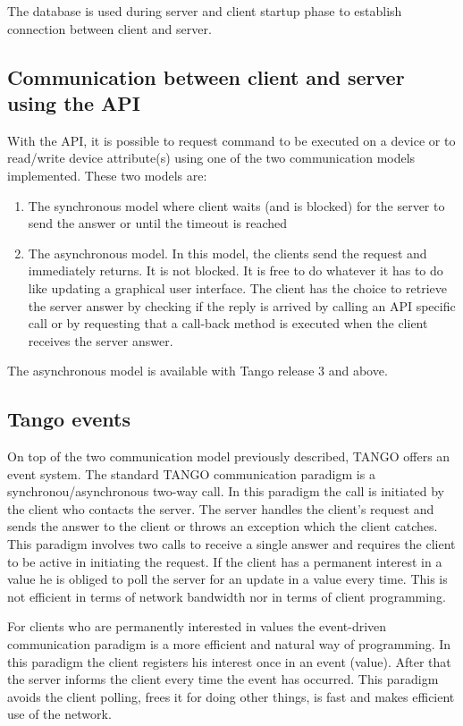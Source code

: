 \vspace{0.3cm}

The database is used during server and client startup phase to establish
connection between client and server.

\subsection{Communication between client and server using the API}

With the API, it is possible to request command to be executed on
a device or to read/write device attribute(s) using one of the two
communication models implemented. These two models are:
\begin{enumerate}
\item The synchronous model where client waits (and is blocked) for the
server to send the answer or until the timeout is reached
\item The asynchronous model. In this model, the clients send the request
and immediately returns. It is not blocked. It is free to do whatever
it has to do like updating a graphical user interface. The client
has the choice to retrieve the server answer by checking if the reply
is arrived by calling an API specific call or by requesting that a
call-back method is executed when the client receives the server answer.
\end{enumerate}
The asynchronous model is available with Tango release 3 and above.

\subsection{Tango events}

On top of the two communication model previously described, TANGO
offers an \textquotedbl{}event system\textquotedbl{}.
The standard TANGO communication paradigm is a synchronou/asynchronous
two-way call. In this paradigm the call is initiated by the client
who contacts the server. The server handles the client's request and
sends the answer to the client or throws an exception which the client
catches. This paradigm involves two calls to receive a single answer
and requires the client to be active in initiating the request. If
the client has a permanent interest in a value he is obliged to poll
the server for an update in a value every time. This is not efficient
in terms of network bandwidth nor in terms of client programming.

For clients who are permanently interested in values the event-driven
communication paradigm is a more efficient and natural way of programming.
In this paradigm the client registers his interest once in an event
(value). After that the server informs the client every time the event
has occurred. This paradigm avoids the client polling, frees it for
doing other things, is fast and makes efficient use of the network.

